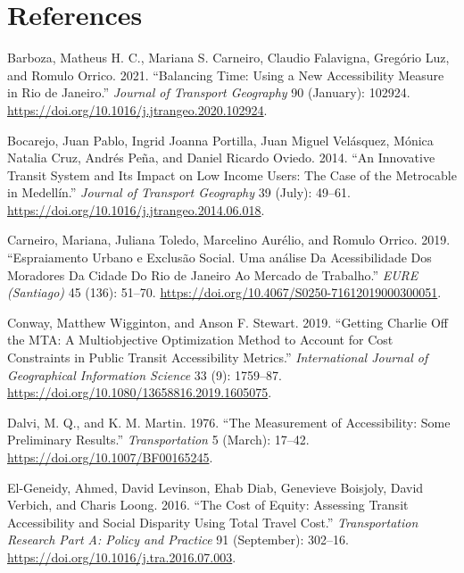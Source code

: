 \documentclass[msc,numbers]{coppe}
\begin{document}
  \hypertarget{references}{%
  \chapter*{References}\label{references}}

  
  

  \hypertarget{refs}{}
  \begin{CSLReferences}{1}{0}
  \leavevmode\hypertarget{ref-barboza2021balancing}{}%
  Barboza, Matheus H. C., Mariana S. Carneiro, Claudio Falavigna, Gregório Luz, and Romulo Orrico. 2021. {``Balancing Time: {Using} a New Accessibility Measure in {Rio} de {Janeiro}.''} \emph{Journal of Transport Geography} 90 (January): 102924. \url{https://doi.org/10.1016/j.jtrangeo.2020.102924}.

  \leavevmode\hypertarget{ref-bocarejo2014innovative}{}%
  Bocarejo, Juan Pablo, Ingrid Joanna Portilla, Juan Miguel Velásquez, Mónica Natalia Cruz, Andrés Peña, and Daniel Ricardo Oviedo. 2014. {``An Innovative Transit System and Its Impact on Low Income Users: The Case of the {Metrocable} in {Medellín}.''} \emph{Journal of Transport Geography} 39 (July): 49--61. \url{https://doi.org/10.1016/j.jtrangeo.2014.06.018}.

  \leavevmode\hypertarget{ref-carneiro2019espraiamento}{}%
  Carneiro, Mariana, Juliana Toledo, Marcelino Aurélio, and Romulo Orrico. 2019. {``Espraiamento Urbano e Exclusão Social. {Uma} análise Da Acessibilidade Dos Moradores Da Cidade Do {Rio} de {Janeiro} Ao Mercado de Trabalho.''} \emph{EURE (Santiago)} 45 (136): 51--70. \url{https://doi.org/10.4067/S0250-71612019000300051}.

  \leavevmode\hypertarget{ref-conway2019getting}{}%
  Conway, Matthew Wigginton, and Anson F. Stewart. 2019. {``Getting {Charlie} Off the {MTA}: A Multiobjective Optimization Method to Account for Cost Constraints in Public Transit Accessibility Metrics.''} \emph{International Journal of Geographical Information Science} 33 (9): 1759--87. \url{https://doi.org/10.1080/13658816.2019.1605075}.

  \leavevmode\hypertarget{ref-dalvi1976measurement}{}%
  Dalvi, M. Q., and K. M. Martin. 1976. {``The Measurement of Accessibility: {Some} Preliminary Results.''} \emph{Transportation} 5 (March): 17--42. \url{https://doi.org/10.1007/BF00165245}.

  \leavevmode\hypertarget{ref-el-geneidy2016cost}{}%
  El-Geneidy, Ahmed, David Levinson, Ehab Diab, Genevieve Boisjoly, David Verbich, and Charis Loong. 2016. {``The Cost of Equity: {Assessing} Transit Accessibility and Social Disparity Using Total Travel Cost.''} \emph{Transportation Research Part A: Policy and Practice} 91 (September): 302--16. \url{https://doi.org/10.1016/j.tra.2016.07.003}.


\end{CSLReferences}
\end{document}
